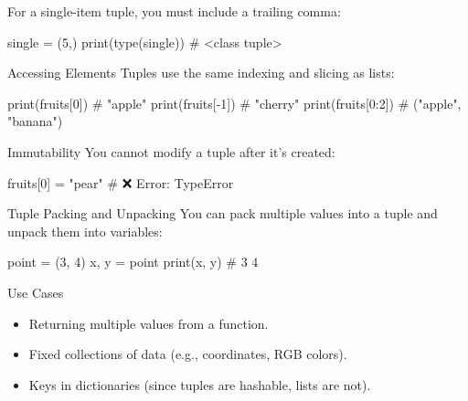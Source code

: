 \documentclass[
  letterpaper,
  DIV=11,
  numbers=noendperiod]{scrreprt}
\newenvironment{Shaded}{\begin{snugshade}}{\end{snugshade}}
\newcommand{\BuiltInTok}[1]{\textcolor[rgb]{0.00,0.23,0.31}{#1}}
\newcommand{\CommentTok}[1]{\textcolor[rgb]{0.37,0.37,0.37}{#1}}
\newcommand{\DecValTok}[1]{\textcolor[rgb]{0.68,0.00,0.00}{#1}}
\newcommand{\NormalTok}[1]{\textcolor[rgb]{0.00,0.23,0.31}{#1}}
\newcommand{\OperatorTok}[1]{\textcolor[rgb]{0.37,0.37,0.37}{#1}}
\newcommand{\StringTok}[1]{\textcolor[rgb]{0.13,0.47,0.30}{#1}}
\providecommand{\tightlist}{%
  \setlength{\itemsep}{0pt}\setlength{\parskip}{0pt}}
\begin{document}
For a single-item tuple, you must include a trailing comma:

\begin{Shaded}
\begin{Highlighting}[]
\NormalTok{single }\OperatorTok{=}\NormalTok{ (}\DecValTok{5}\NormalTok{,)}
\BuiltInTok{print}\NormalTok{(}\BuiltInTok{type}\NormalTok{(single))   }\CommentTok{\# \textless{}class \textquotesingle{}tuple\textquotesingle{}\textgreater{}}
\end{Highlighting}
\end{Shaded}

Accessing Elements Tuples use the same indexing and slicing as lists:

\begin{Shaded}
\begin{Highlighting}[]
\BuiltInTok{print}\NormalTok{(fruits[}\DecValTok{0}\NormalTok{])     }\CommentTok{\# "apple"}
\BuiltInTok{print}\NormalTok{(fruits[}\OperatorTok{{-}}\DecValTok{1}\NormalTok{])    }\CommentTok{\# "cherry"}
\BuiltInTok{print}\NormalTok{(fruits[}\DecValTok{0}\NormalTok{:}\DecValTok{2}\NormalTok{])   }\CommentTok{\# ("apple", "banana")}
\end{Highlighting}
\end{Shaded}

Immutability You cannot modify a tuple after it's created:

\begin{Shaded}
\begin{Highlighting}[]
\NormalTok{fruits[}\DecValTok{0}\NormalTok{] }\OperatorTok{=} \StringTok{"pear"}   \CommentTok{\# ❌ Error: TypeError}
\end{Highlighting}
\end{Shaded}

Tuple Packing and Unpacking You can pack multiple values into a tuple
and unpack them into variables:

\begin{Shaded}
\begin{Highlighting}[]
\NormalTok{point }\OperatorTok{=}\NormalTok{ (}\DecValTok{3}\NormalTok{, }\DecValTok{4}\NormalTok{)}
\NormalTok{x, y }\OperatorTok{=}\NormalTok{ point}
\BuiltInTok{print}\NormalTok{(x, y)   }\CommentTok{\# 3 4}
\end{Highlighting}
\end{Shaded}

Use Cases

\begin{itemize}
\tightlist
\item
  Returning multiple values from a function.
\item
  Fixed collections of data (e.g., coordinates, RGB colors).
\item
  Keys in dictionaries (since tuples are hashable, lists are not).
\end{itemize}
\end{document}
